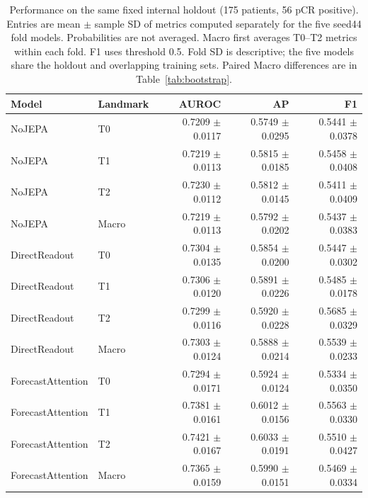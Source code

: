 \begin{table}[t]
\centering
\small
\caption{Performance on the same fixed internal holdout (175 patients, 56 pCR positive). Entries are mean $\pm$ sample SD of metrics computed separately for the five seed44 fold models. Probabilities are not averaged. Macro first averages T0--T2 metrics within each fold. F1 uses threshold 0.5. Fold SD is descriptive; the five models share the holdout and overlapping training sets. Paired Macro differences are in Table~\ref{tab:bootstrap}.}
\label{tab:main}
\begin{tabular}{llrrr}
\toprule
Model & Landmark & AUROC & AP & F1 \\
\midrule
NoJEPA & T0 & 0.7209 $\pm$ 0.0117 & 0.5749 $\pm$ 0.0295 & 0.5441 $\pm$ 0.0378 \\
NoJEPA & T1 & 0.7219 $\pm$ 0.0113 & 0.5815 $\pm$ 0.0185 & 0.5458 $\pm$ 0.0408 \\
NoJEPA & T2 & 0.7230 $\pm$ 0.0112 & 0.5812 $\pm$ 0.0145 & 0.5411 $\pm$ 0.0409 \\
NoJEPA & Macro & 0.7219 $\pm$ 0.0113 & 0.5792 $\pm$ 0.0202 & 0.5437 $\pm$ 0.0383 \\
DirectReadout & T0 & 0.7304 $\pm$ 0.0135 & 0.5854 $\pm$ 0.0200 & 0.5447 $\pm$ 0.0302 \\
DirectReadout & T1 & 0.7306 $\pm$ 0.0120 & 0.5891 $\pm$ 0.0226 & 0.5485 $\pm$ 0.0178 \\
DirectReadout & T2 & 0.7299 $\pm$ 0.0116 & 0.5920 $\pm$ 0.0228 & 0.5685 $\pm$ 0.0329 \\
DirectReadout & Macro & 0.7303 $\pm$ 0.0124 & 0.5888 $\pm$ 0.0214 & 0.5539 $\pm$ 0.0233 \\
ForecastAttention & T0 & 0.7294 $\pm$ 0.0171 & 0.5924 $\pm$ 0.0124 & 0.5334 $\pm$ 0.0350 \\
ForecastAttention & T1 & 0.7381 $\pm$ 0.0161 & 0.6012 $\pm$ 0.0156 & 0.5563 $\pm$ 0.0330 \\
ForecastAttention & T2 & 0.7421 $\pm$ 0.0167 & 0.6033 $\pm$ 0.0191 & 0.5510 $\pm$ 0.0427 \\
ForecastAttention & Macro & 0.7365 $\pm$ 0.0159 & 0.5990 $\pm$ 0.0151 & 0.5469 $\pm$ 0.0334 \\
\bottomrule
\end{tabular}
\end{table}
